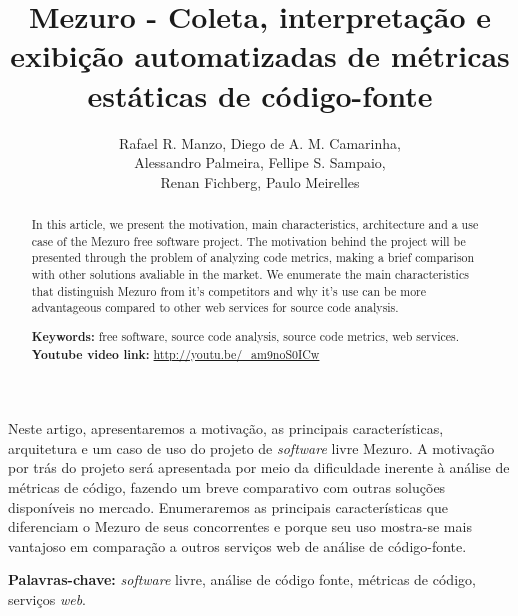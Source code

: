 \documentclass[12pt]{article}
\begin{document}
\sloppy
\title{Mezuro - Coleta, interpretação e exibição automatizadas de métricas estáticas de código-fonte}

\author{Rafael R. Manzo, Diego de A. M. Camarinha,\\
        Alessandro Palmeira, Fellipe S. Sampaio,\\
        Renan Fichberg, Paulo Meirelles}

\address{Instituto de Matemática e Estatística -- Universidade de São Paulo (USP)\\
  Rua do Matão, 1010 -- 05508-090 -- Cidade Universitária -- São Paulo -- SP -- Brasil
\nextinstitute
  Faculdade de Engenharia -- UnB Gama (FGA)\\
  Gama -- DF -- Brasil
}

\maketitle
\begin{abstract}
  In this article, we present the motivation, main characteristics, architecture and a use case of the Mezuro free software project. The motivation behind the project will be presented through the problem of analyzing code metrics, making a brief comparison with other solutions avaliable in the market. We enumerate the main characteristics that distinguish Mezuro from it's competitors and why it's use can be more advantageous compared to other web services for source code analysis.

\textbf{Keywords:} free software, source code analysis, source code metrics, web services.
\\
\textbf{Youtube video link:} \url{http://youtu.be/_am9noS0ICw}
\end{abstract}

\begin{resumo}
  Neste artigo, apresentaremos a motivação, as principais características, arquitetura e um caso de uso do projeto de \textit{software} livre Mezuro. A motivação por trás do projeto será apresentada por meio da dificuldade inerente à análise de métricas de código, fazendo um breve comparativo com outras soluções disponíveis no mercado. Enumeraremos as principais características que diferenciam o Mezuro de seus concorrentes e porque seu uso mostra-se mais vantajoso em comparação a outros serviços web de análise de código-fonte.

\textbf{Palavras-chave:} \textit{software} livre, análise de código fonte, métricas de código, serviços \textit{web}.
\end{resumo}
\end{document}
